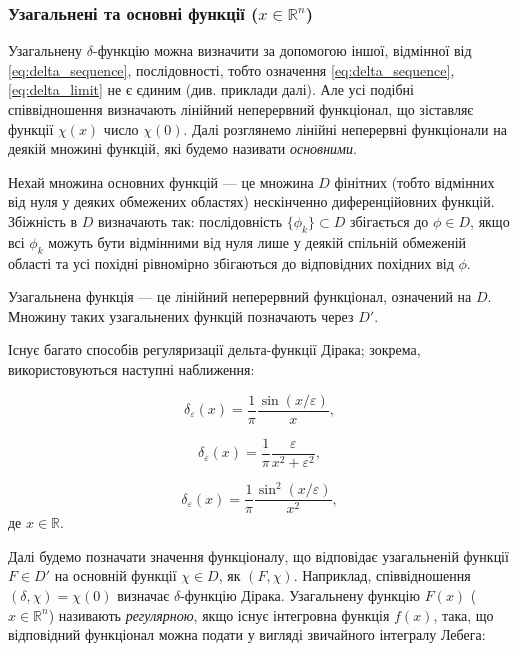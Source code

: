 \subsubsection{Узагальнені та основні функції (\( x \in \mathbb{R}^n \))}

Узагальнену \(\delta\)-функцію можна визначити за допомогою іншої, відмінної від \eqref{eq:delta_sequence}, послідовності, тобто означення
\eqref{eq:delta_sequence}, \eqref{eq:delta_limit} не є єдиним (див. приклади далі). Але усі подібні співвідношення визначають лінійний неперервний
функціонал, що зіставляє функції \( \chi(x) \) число \( \chi(0) \). Далі розглянемо лінійні неперервні функціонали на деякій множині функцій, які будемо
називати \textit{основними}.

Нехай множина основних функцій --- це множина \( D \) фінітних (тобто відмінних від нуля у деяких обмежених областях) нескінченно диференційовних
функцій. Збіжність в \( D \) визначають так: послідовність \( \{\phi_k\} \subset D \) збігається до \( \phi \in D \), якщо всі \( \phi_k \) можуть бути
відмінними від нуля лише у деякій спільній обмеженій області та усі похідні рівномірно збігаються до відповідних похідних від \( \phi \).

Узагальнена функція --- це лінійний неперервний функціонал, означений на \( D \). Множину таких узагальнених функцій позначають через \( D' \).

Існує багато способів регуляризації дельта-функції Дірака; зокрема, використовуються наступні наближення:

\begin{equation}
\delta_{\varepsilon}(x) = \frac{1}{\pi} \frac{\sin(x/\varepsilon)}{x},
\label{eq:delta_sin}
\end{equation}

\begin{equation}
\delta_{\varepsilon}(x) = \frac{1}{\pi} \frac{\varepsilon}{x^2 + \varepsilon^2},
\label{eq:delta_lorentz}
\end{equation}

\begin{equation}
\delta_{\varepsilon}(x) = \frac{1}{\pi} \frac{\sin^2(x/\varepsilon)}{x^2},
\label{eq:delta_sin2}
\end{equation}
де \( x \in \mathbb{R} \).

Далі будемо позначати значення функціоналу, що відповідає узагальненій функції \( F \in D' \) на основній функції \( \chi \in D \), як \( (F, \chi) \).
Наприклад, співвідношення \( (\delta, \chi) = \chi(0) \) визначає \(\delta\)-функцію Дірака. Узагальнену функцію \( F(x) \) (\( x \in \mathbb{R}^n \))
називають \textit{регулярною}, якщо існує інтегровна функція \( f(x) \), така, що відповідний функціонал можна подати у вигляді звичайного інтегралу
Лебега:

